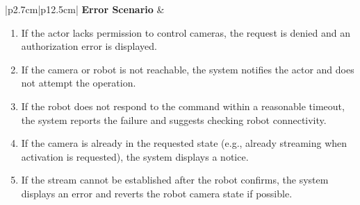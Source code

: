 \begin{table}[H]
\begin{tabular}{|p{2.7cm}|p{12.5cm}|}
\textbf{Error Scenario} &
\begin{minipage}[t]{\linewidth}
\begin{enumerate}[topsep=0pt,itemsep=1pt,parsep=0pt,partopsep=0pt]
\item If the actor lacks permission to control cameras, the request is denied and an authorization error is displayed.
\item If the camera or robot is not reachable, the system notifies the actor and does not attempt the operation.
\item If the robot does not respond to the command within a reasonable timeout, the system reports the failure and suggests checking robot connectivity.
\item If the camera is already in the requested state (e.g., already streaming when activation is requested), the system displays a notice.
\item If the stream cannot be established after the robot confirms, the system displays an error and reverts the robot camera state if possible.
\end{enumerate}
\end{minipage} \\ \hline

\end{tabular}
\label{tab:admin-activate-deactivate-camera}
\end{table}



